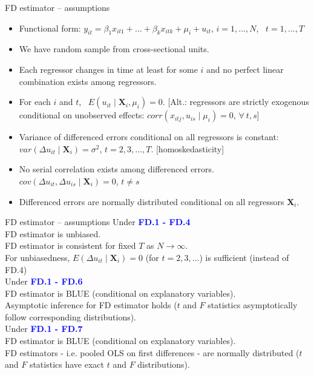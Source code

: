 \documentclass{beamer}
\begin{document}
\begin{frame}{FD estimator – assumptions}
\begin{itemize}
\item[\textbf{FD.1}] Functional form: $y_{it} = \beta_1 x_{it1} + \dots + \beta_k x_{itk} + \mu_i + u_{it}$, $i = 1, \dots, N$, \ $t = 1, \dots, T$
\item[\textbf{FD.2}] We have random sample from cross-sectional units.
\item[\textbf{FD.3}] Each regressor changes in time at least for some $i$ and no perfect linear combination exists among regressors.
\item[\textbf{FD.4}] For each $i$ and $t$, \ $E (u_{it} \mid \bm{X}_i, \mu_i) = 0$. [Alt.: regressors are strictly exogenous conditional on unobserved effects: $\textit{corr}(x_{itj}, u_{is} \mid \mu_i)=0$, \quad $\forall \ t, s$]
\item[\textbf{FD.5}] Variance of differenced errors conditional on all regressors is constant: $\textit{var}(\Delta u_{it} \mid \bm{X}_i) = \sigma^2$, \quad $t= 2,3, \dots, T$. [homoskedasticity]
\item[\textbf{FD.6}] No serial correlation exists among differenced errors. $\textit{cov}(\Delta u_{it}, \Delta u_{is} \mid \bm{X}_i) = 0$, \quad $t \neq s$
\item[\textbf{FD.7}] Differenced errors are normally distributed conditional on all regressors $\bm{X}_i$.
\end{itemize}
\end{frame}
\begin{frame}{FD estimator – assumptions}
Under  \textcolor{blue}{\textbf{FD.1 - FD.4}}\\
FD estimator is unbiased. \\
FD estimator is consistent for fixed $T$ as $N \rightarrow \infty$.\\
For unbiasedness, $E (\Delta u_{it} \mid \bm{X}_i) = 0$ (for $t = 2,3, \dots$) is sufficient (instead of FD.4)\\
\medskip
Under \textcolor{blue}{\textbf{FD.1 - FD.6}}\\
FD estimator is BLUE (conditional on explanatory variables).\\
Asymptotic inference for FD estimator holds ($t$ and $F$ statistics asymptotically follow corresponding distributions).\\
\medskip
Under  \textcolor{blue}{\textbf{FD.1 - FD.7}}\\
FD estimator is BLUE (conditional on explanatory variables).\\
FD estimators - i.e. pooled OLS on first differences - are normally distributed ($t$ and $F$ statistics have exact $t$ and $F$ distributions).
\end{frame}
\end{document}
